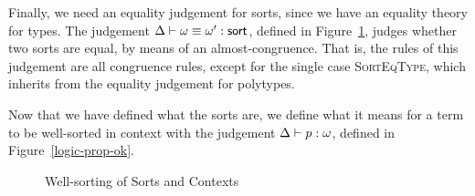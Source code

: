 Finally, we need an equality judgement for sorts, since we have an
equality theory for types. The judgement
${\Delta} \vdash {\omega} \equiv {\omega'} : \mbox{\textsf{{sort}}}$, defined in
Figure~\ref{logic-sort-ok}, judges whether two sorts are equal, by
means of an almost-congruence. That is, the rules of this judgement
are all congruence rules, except for the single case
\textsc{SortEqType}, which inherits from the equality judgement for
polytypes.

Now that we have defined what the sorts are, we define what it means
for a term to be well-sorted in context with the judgement
${\Delta} \vdash {p} : {\omega}$, defined in Figure~\ref{logic-prop-ok}.

\begin{figure}
\caption{Well-sorting of Sorts and Contexts}
\label{logic-sort-ok}
\end{figure}


